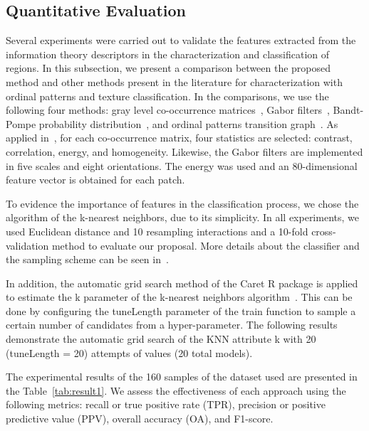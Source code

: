 \documentclass[journal]{IEEEtran}
\begin{document}
	\subsection{Quantitative Evaluation}
	
	Several experiments were carried out to validate the features extracted from the information theory descriptors in the characterization and classification of regions.
	In this subsection, we present a comparison between the proposed method and other methods present in the literature for characterization with ordinal patterns and texture classification.
	In the comparisons, we use the following four methods: gray level co-occurrence matrices~\cite{kourgli2012texture}, Gabor filters~\cite{weldon1996efficient}, Bandt-Pompe probability distribution~\cite{Bandt2002Permutation}, and ordinal patterns transition graph~\cite{borges2019learning}.
	As applied in~\cite{guan2019covariance}, for each co-occurrence matrix, four statistics are selected: contrast, correlation, energy, and homogeneity.
	Likewise, the Gabor filters are implemented in five scales and eight orientations.
	The energy was used and an 80-dimensional feature vector is obtained for each patch.
	
	To evidence the importance of features in the classification process, we chose the algorithm of the k-nearest neighbors, due to its simplicity.
	In all experiments, we used Euclidean distance and 10 resampling interactions and a 10-fold cross-validation method to evaluate our proposal.
	More details about the classifier and the sampling scheme can be seen in~\cite{mitchell1997machine}. 
	
	In addition, the automatic grid search method of the Caret R package is applied to estimate the k parameter of the k-nearest neighbors algorithm~\cite{kuhn2008building}.
	This can be done by configuring the tuneLength parameter of the train function to sample a certain number of candidates from a hyper-parameter.
	The following results demonstrate the automatic grid search of the KNN attribute k with 20 (tuneLength = 20) attempts of values (20 total models).
	
	The experimental results of the 160 samples of the dataset used are presented in the Table~\ref{tab:result1}.
	We assess the effectiveness of each approach using the following metrics: recall or true positive rate (TPR), precision or positive predictive value (PPV), overall accuracy (OA), and F1-score.
	
\end{document}
